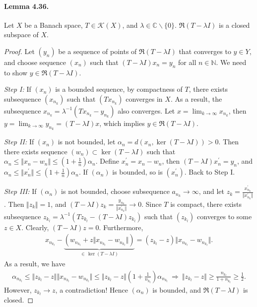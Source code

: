 \documentclass{article}
\begin{document}
\paragraph{Lemma 4.36.\label{lemma:4.36}} Let $X$ be a Banach space, $T\in\mathcal{K}(X)$, and $\lambda\in\mathbb{C}\backslash\{0\}$. $\mathfrak{R}(T-\lambda I)$ is a closed subspace of $X$.
\begin{proof}
Let $(y_n)$ be a sequence of points of $\mathfrak{R}(T-\lambda I)$ that converges to $y\in Y$, and choose sequence $(x_n)$ such that $(T-\lambda I)x_n=y_n$ for all $n\in\mathbb{N}$. We need to show $y\in\mathfrak{R}(T-\lambda I)$.

\textit{Step I:} If $(x_n)$ is a bounded sequence, by compactness of $T$, there exists subsequence $(x_{n_k})$ such that $(Tx_{n_k})$ converges in $X$. As a result, the subsequence $x_{n_k}=\lambda^{-1}(Tx_{n_k} - y_{n_k})$ also converges. Let $x=\lim_{k\to\infty}x_{n_k}$, then $y=\lim_{k\to\infty} y_{n_k} =(T-\lambda I)x$, which implies $y\in\mathfrak{R}(T-\lambda I)$.

\textit{Step II:} If $(x_n)$ is not bounded, let $\alpha_n=d(x_n,\ker(T-\lambda I))>0$. Then there exists sequence $(w_n)\subset\ker(T-\lambda I)$ such that $\alpha_n\leq\Vert x_n-w_n\Vert\leq\left(1+\frac{1}{n}\right)\alpha_n$. Define $x_n^\prime=x_n - w_n$, then $(T-\lambda I)x_n^\prime=y_n$, and $\alpha_n\leq\Vert x_n^\prime\Vert\leq\left(1+\frac{1}{n}\right)\alpha_n$. If $(\alpha_n)$ is bounded, so is $(x_n^\prime)$. Back to Step I.

\textit{Step III:} If $(\alpha_n)$ is not bounded, choose subsequence $a_{n_k}\to \infty$, and let $z_{k}=\frac{x_{n_k}^\prime}{\Vert x_{n_k}^\prime\Vert}$. Then $\Vert z_k\Vert=1$, and $(T-\lambda I)z_k=\frac{y_{n_k}}{\Vert x_{n_k}^\prime\Vert}\to 0$. Since $T$ is compact, there exists subsequence $z_{k_l}=\lambda^{-1}\left(Tz_{k_l} - (T-\lambda I)z_{k_l}\right)$ such that $(z_{k_l})$ converges to some $z\in X$. Clearly, $(T-\lambda I)z=0$. Furthermore,
\begin{align*}
	x_{n_{k_l}} - \underbrace{\left(w_{n_{k_l}} + z\bigl\Vert x_{n_{k_l}}-w_{n_{k_l}}\bigr\Vert\right)}_{\in\,\ker(T-\lambda I)} = (z_{{k_l}}-z)\bigl\Vert x_{n_{k_l}}-w_{n_{k_l}}\bigr\Vert.
\end{align*}
As a result, we have
\begin{align*}
	\alpha_{n_{k_l}}\leq \bigl\Vert z_{{k_l}}-z\bigr\Vert\bigl\Vert x_{n_{k_l}}-w_{n_{k_l}}\bigr\Vert\leq\bigl\Vert z_{{k_l}}-z\bigr\Vert\left(1+\frac{1}{n_{k_l}}\right)\alpha_{n_{k_l}}\ \Rightarrow\ \bigl\Vert z_{{k_l}}-z\bigr\Vert\geq\frac{n_{k_l}}{1+n_{k_l}}\geq\frac{1}{2}.
\end{align*}
However, $z_{{k_l}}\to z$, a contradiction! Hence $(\alpha_n)$ is bounded, and $\mathfrak{R}(T-\lambda I)$ is closed.
\end{proof}
\end{document}
